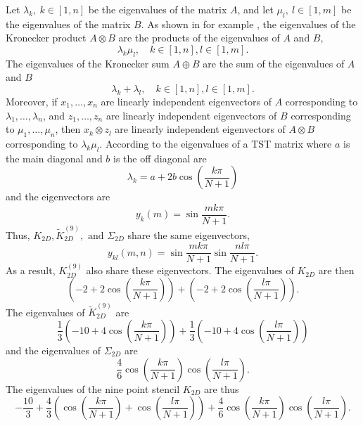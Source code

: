 Let $\lambda_k, ~k\in[1, n]$ be the eigenvalues of the matrix $A$, and let $\mu_l, ~l\in [1, m]$ be the eigenvalues of the matrix $B$.
As shown in for example \textcite{Laub_2004}, the eigenvalues of the Kronecker product $A \otimes B$ are the products of the eigenvalues of $A$ and $B$,
$$
\lambda_k\mu_l, \quad k \in [1, n], l\in [1,m].
$$
The eigenvalues of the Kronecker sum $A\oplus B$ are the sum of the eigenvalues of $A$ and $B$
$$
\lambda_k + \lambda_l, \quad k \in [1, n], l\in [1,m].
$$
Moreover, if $x_1, \dots, x_n$ are linearly independent eigenvectors of $A$ corresponding to $\lambda_1, \dots, \lambda_n$, and $z_1, \dots, z_n$ are linearly independent eigenvectors of $B$ corresponding to $\mu_1, \dots, \mu_n$, then $x_k \otimes z_l$ are linearly independent eigenvectors of $A\otimes B$ corresponding to $\lambda_k \mu_l$.
According to \cite{tridiagonal} the eigenvalues of a TST matrix where $a$ is the main diagonal and $b$ is the off diagonal are 
\begin{equation*}
	\lambda_k = a + 2 b \cos\left(\frac{k \pi}{N + 1}\right)
\end{equation*}
and the eigenvectors are
\begin{equation*}
  y_k(m) = \sin\frac{m k \pi}{N+1}.
\end{equation*}
Thus, $K_{2D}, \tilde{K}_{2D}^{(9)}, \text{ and } \Sigma_{2D}$ share the same eigenvectors,
\begin{equation}\label{eq:pde:eigenvec}
y_{kl}(m, n) = \sin\frac{m k \pi}{N+1}\sin\frac{n l \pi}{N+1}.
\end{equation}
As a result, $K_{2D}^{(9)}$ also share these eigenvectors.
The eigenvalues of $K_{2D}$ are then
$$
\left(-2 + 2\cos\left(\frac{k \pi}{N + 1}\right)\right)
+
\left(-2 + 2\cos\left(\frac{l \pi}{N + 1}\right)\right).
$$
The eigenvalues of $\tilde{K}_{2D}^{(9)}$ are
$$
\frac13\left(-10 + 4\cos\left(\frac{k \pi}{N + 1}\right)\right)
+
\frac13\left(-10 + 4\cos\left(\frac{l \pi}{N + 1}\right)\right)
$$
and the eigenvalues of $\Sigma_{2D}$ are
$$
\frac46
\cos\left(\frac{k \pi}{N+1}\right)
\cos\left(\frac{l \pi}{N+1}\right).
$$
The eigenvalues of the nine point stencil $K_{2D}$ are thus
\begin{equation}
  -\frac{10}{3}
  + \frac43
  \left(
  \cos(\frac{k \pi}{N+1})
  + \cos(\frac{l \pi}{N+1})
  \right)
  +
  \frac46
  \cos(\frac{k \pi}{N+1})
  \cos(\frac{l \pi}{N+1}).
\end{equation}

